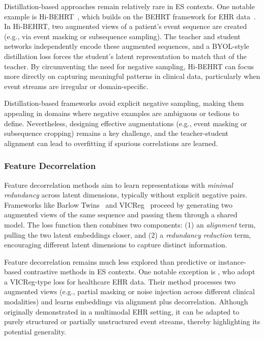 \documentclass[twoside,11pt]{article}
\begin{document}
Distillation-based approaches remain relatively rare in ES contexts. One notable example is Hi-BEHRT~, which builds on the BEHRT framework for EHR data~. In Hi-BEHRT, two augmented views of a patient's event sequence are created (e.g., via event masking or subsequence sampling). The teacher and student networks independently encode these augmented sequences, and a BYOL-style distillation loss forces the student’s latent representation to match that of the teacher. By circumventing the need for negative sampling, Hi-BEHRT can focus more directly on capturing meaningful patterns in clinical data, particularly when event streams are irregular or domain-specific.

Distillation-based frameworks avoid explicit negative sampling, making them appealing in domains where negative examples are ambiguous or tedious to define. Nevertheless, designing effective augmentations (e.g., event masking or subsequence cropping) remains a key challenge, and the teacher-student alignment can lead to overfitting if spurious correlations are learned.

\subsubsection{Feature Decorrelation}
\label{subsubsec:feature-decorrelation}

Feature decorrelation methods aim to learn representations with {\it minimal redundancy} across latent dimensions, typically without explicit negative pairs. Frameworks like Barlow Twins~ and VICReg~ proceed by generating two augmented views of the same sequence and passing them through a shared model. The loss function then combines two components: (1) an {\it alignment} term, pulling the two latent embeddings closer, and (2) a {\it redundancy reduction} term, encouraging different latent dimensions to capture distinct information.

Feature decorrelation remains much less explored than predictive or instance-based contrastive methods in ES contexts. One notable exception is , who adopt a VICReg-type loss for healthcare EHR data. Their method processes two augmented views (e.g., partial masking or noise injection across different clinical modalities) and learns embeddings via alignment plus decorrelation. Although originally demonstrated in a multimodal EHR setting, it can be adapted to purely structured or partially unstructured event streams, thereby highlighting its potential generality.
\end{document}
